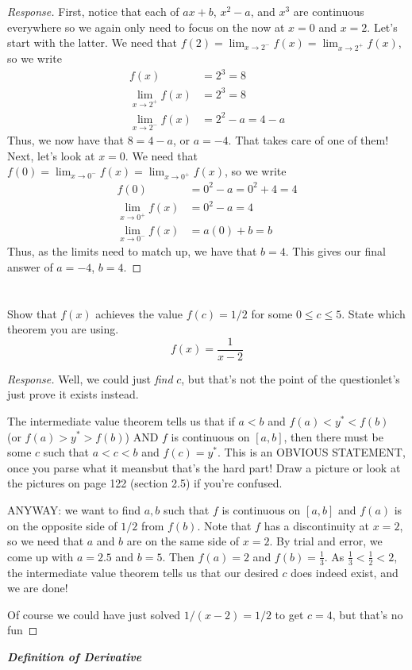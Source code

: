 \documentclass[english]{article}
\newcommand{\prob}[1]{\setcounter{section}{#1-1}\section{}}
\theoremstyle{remark}
\theoremstyle{definition}
\newcommand{\resp}[1]{\begin{proof}[Response]{#1}\end{proof}}
\begin{document}
	\resp{First, notice that each of $ax+b$, $x^2-a$, and $x^3$ are continuous everywhere so we again only need to focus on the \say{seams,} now at $x=0$ and $x=2$. Let's start with the latter. We need that $f(2)=\lim_{x\to 2^-}f(x)=\lim_{x\to 2^+}f(x)$, so we write
		\begin{align*}
			f(x)&=2^3=8\\
			\lim_{x\to 2^+}f(x)&=2^3=8\\
			\lim_{x\to 2^-}f(x)&=2^2-a=4-a
		\end{align*}
	Thus, we now have that $8=4-a$, or $a=-4$. That takes care of one of them! Next, let's look at $x=0$. We need that $f(0)=\lim_{x\to 0^-}f(x)=\lim_{x\to 0^+}f(x)$, so we write
	\begin{align*}
	f(0)&=0^2-a=0^2+4=4\\
	\lim_{x\to 0^+}f(x)&=0^2-a=4\\
	\lim_{x\to 0^-}f(x)&=a(0)+b=b
	\end{align*}
	Thus, as the limits need to match up, we have that $b=4$. This gives our final answer of $a=-4$, $b=4$.

}
	\prob{5} Show that $f(x)$ achieves the value $f(c)=1/2$ for some $0\leq c \leq 5$. State which theorem you are using.
	$$f(x)=\frac{1}{x-2}$$\resp{
Well, we could just \emph{find} $c$, but that's not the point of the question\textemdash let's just prove it exists instead.

The intermediate value theorem tells us that if $a<b$ and $f(a)<y^*<f(b)$ (or $f(a)>y^*>f(b)$) AND $f$ is continuous on $[a,b]$, then there must be some $c$ such that $a<c<b$ and $f(c)=y^*$. This is an OBVIOUS STATEMENT, once you parse what it means\textemdash but that's the hard part! Draw a picture or look at the pictures on page 122 (section 2.5) if you're confused.

ANYWAY: we want to find $a,b$ such that $f$ is continuous on $[a,b]$ and $f(a)$ is on the opposite side of $1/2$ from $f(b)$. Note that $f$ has a discontinuity at $x=2$, so we need that $a$ and $b$ are on the same side of $x=2$. By trial and error, we come up with $a=2.5$ and $b=5$. Then $f(a)=2$ and $f(b)=\frac{1}{3}$. As $\frac{1}{3}<\frac{1}{2}<2$, the intermediate value theorem tells us that our desired $c$ does indeed exist, and we are done!

Of course we could have just solved $1/(x-2)=1/2$ to get $c=4$, but that's no fun\textellipsis

}
	\begin{center}{\LARGE\textbf{\emph{Definition of Derivative}}}\end{center}
\end{document}
